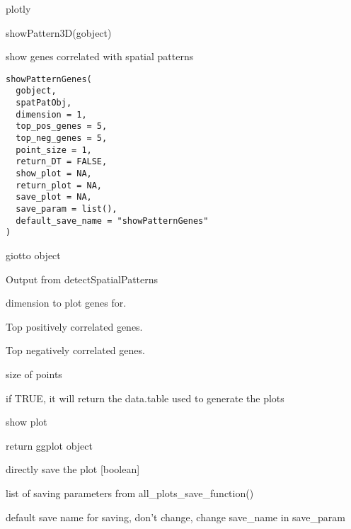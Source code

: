 \documentclass[a4paper]{book}
\begin{document}
%
\begin{Value}
plotly
\end{Value}
%
\begin{Examples}
\begin{ExampleCode}
    showPattern3D(gobject)
\end{ExampleCode}
\end{Examples}
%
\begin{Description}\relax
show genes correlated with spatial patterns
\end{Description}
%
\begin{Usage}
\begin{verbatim}
showPatternGenes(
  gobject,
  spatPatObj,
  dimension = 1,
  top_pos_genes = 5,
  top_neg_genes = 5,
  point_size = 1,
  return_DT = FALSE,
  show_plot = NA,
  return_plot = NA,
  save_plot = NA,
  save_param = list(),
  default_save_name = "showPatternGenes"
)
\end{verbatim}
\end{Usage}
%
\begin{Arguments}
\begin{ldescription}
\item[\code{gobject}] giotto object

\item[\code{spatPatObj}] Output from detectSpatialPatterns

\item[\code{dimension}] dimension to plot genes for.

\item[\code{top\_pos\_genes}] Top positively correlated genes.

\item[\code{top\_neg\_genes}] Top negatively correlated genes.

\item[\code{point\_size}] size of points

\item[\code{return\_DT}] if TRUE, it will return the data.table used to generate the plots

\item[\code{show\_plot}] show plot

\item[\code{return\_plot}] return ggplot object

\item[\code{save\_plot}] directly save the plot [boolean]

\item[\code{save\_param}] list of saving parameters from all\_plots\_save\_function()

\item[\code{default\_save\_name}] default save name for saving, don't change, change save\_name in save\_param
\end{ldescription}
\end{Arguments}
\end{document}

